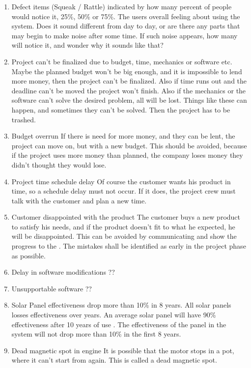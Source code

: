 \documentclass[12pt,a4paper]{report}
\begin{document}
\begin{enumerate}
\item Defect items (Squeak / Rattle) indicated by how many percent of people would notice it, 25\%, 50\% or 75\%.
\subitem The users overall feeling about using the system. Does it sound different from day to day, or are there any parts that may begin to make noise after some time. If such noise appears, how many will notice it, and wonder why it sounds like that?
\item Project can’t be finalized due to budget, time, mechanics or software etc. 
\subitem Maybe the planned budget won’t be big enough, and it is impossible to lend more money, then the project can’t be finalized. Also if time runs out and the deadline can’t be moved the project won’t finish. Also if the mechanics or the software can’t solve the desired problem, all will be lost. Things like these can happen, and sometimes they can’t be solved. Then the project has to be trashed. 
\item Budget overrun
\subitem If there is need for more money, and they can be lent, the project can move on, but with a new budget. This should be avoided, because if the project uses more money than planned, the company loses money they didn’t thought they would lose. 
\item Project time schedule delay
\subitem Of course the customer wants his product in time, so a schedule delay must not occur. If it does, the project crew must talk with the customer and plan a new time. 
\item Customer disappointed with the product
\subitem The customer buys a new product to satisfy his needs, and if the product doesn’t fit to what he expected, he will be disappointed. This can be avoided by communicating and show the progress to the . The mistakes shall be identified as early in the project phase as possible. 
\item Delay in software modifications
\subitem ??
\item Unsupportable software
\subitem ??
\item Solar Panel effectiveness drop more than 10\% in 8 years.
\subitem All solar panels losses effectiveness over years. An average solar panel will have 90\% effectiveness after 10 years of use . The effectiveness of the panel in the system will not drop more than 10\% in the first 8 years. 
\item Dead magnetic spot in engine
\subitem It is possible that the motor stops in a pot, where it can’t start from again. This is called a dead magnetic spot. 

\end{enumerate}
\end{document}
